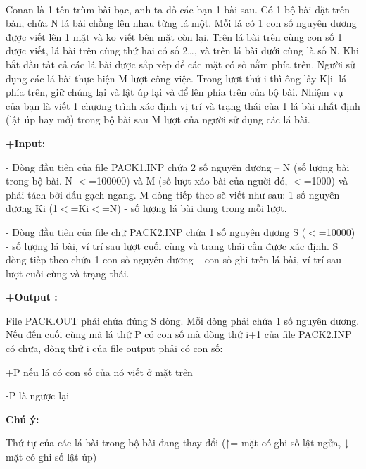  




Conan là 1 tên trùm bài bạc, anh ta đố các bạn 1 bài sau. Có 1 bộ bài đặt trên bàn, chứa N lá bài chồng lên nhau từng lá một. Mỗi lá có 1 con số nguyên dương được viết lên 1 mặt và ko viết bên mặt còn lại. Trên lá bài trên cùng con số 1 được viết, lá bài trên cùng thứ hai có số 2…, và trên lá bài dưới cùng là số N. Khi bắt đầu tất cả các lá bài được sắp xếp để các mặt có số nằm phía trên. Người sử dụng các lá bài thực hiện M lượt công việc. Trong lượt thứ i thì ông lấy K[i] lá phía trên, giữ chúng lại và lật úp lại và để lên phía trên của bộ bài. Nhiệm vụ của bạn là viết 1 chương trình xác định vị trí và trạng thái của 1 lá bài nhất định (lật úp hay mở) trong bộ bài sau M lượt của người sử dụng các lá bài.



\textbf{+Input:}

\textbf{}

- Dòng đầu tiên của file PACK1.INP chứa 2 số nguyên dương – N (số lượng bài trong bộ bài. N $<$=100000) và M (số lượt xáo bài của người đó, $<$=1000) và phải tách bởi dấu gạch ngang. M dòng tiếp theo sẽ viết như sau: 1 số nguyên dương Ki (1$<$=Ki$<$=N) - số lượng lá bài dung trong mỗi lượt.



- Dòng đầu tiên của file chữ PACK2.INP chứa 1 số nguyên dương S ($<$=10000) - số lượng lá bài, ví trí sau lượt cuối cùng và trang thái cần được xác định. S dòng tiếp theo chứa 1 con số nguyên dương – con số ghi trên lá bài, ví trí sau lượt cuối cùng và trạng thái. 



\textbf{+Output :}



File PACK.OUT phải chứa đúng S dòng. Mỗi dòng phải chứa 1 số nguyên dương. Nếu đến cuối cùng mà lá thứ P có con số mà dòng thứ i+1 của file PACK2.INP có chưa, dòng thứ i của file output phải có con số:

+P nếu lá có con số của nó viết ở mặt trên

-P là ngược lại



\textbf{Chú ý:}



Thứ tự của các lá bài trong bộ bài đang thay đổi (↑= mặt có ghi số lật ngửa, ↓ mặt có ghi số lật úp)




